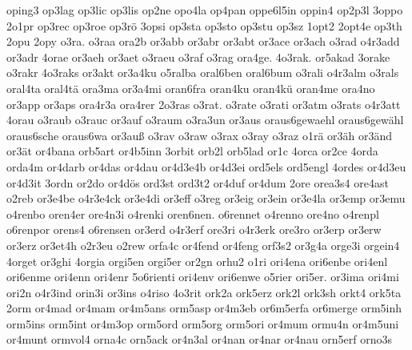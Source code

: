 {    oping3
    op3lag
    op3lic
    op3lis
    op2ne
    opo4la
    op4pan
    oppe6l5in
    oppin4
    op2p3l
    3oppo
    2o1pr
    op3rec
    op3roe
    op3rö
    3opsi
    op3sta
    op3sto
    op3stu
    op3sz
    1opt2
    2opt4e
    op3th
    2opu
    2opy
    o3ra.
    o3raa
    ora2b
    or3abb
    or3abr
    or3abt
    or3ace
    or3ach
    o3rad
    o4r3add
    or3adr
    4orae
    or3aeh
    or3aet
    o3raeu
    o3raf
    o3rag
    ora4ge.
    4o3rak.
    or5akad
    3orake
    o3rakr
    4o3raks
    or3akt
    or3a4ku
    o5ralba
    oral6ben
    oral6bum
    o3rali
    o4r3alm
    o3rals
    oral4ta
    oral4tä
    ora3ma
    or3a4mi
    oran6fra
    oran4ku
    oran4kü
    oran4me
    ora4no
    or3app
    or3aps
    ora4r3a
    ora4rer
    2o3ras
    o3rat.
    o3rate
    o3rati
    or3atm
    o3rats
    o4r3att
    4orau
    o3raub
    o3rauc
    or3auf
    o3raum
    o3ra3un
    or3aus
    oraus6gewaehl
    oraus6gewähl
    oraus6sche
    oraus6wa
    or3auß
    o3rav
    o3raw
    o3rax
    o3ray
    o3raz
    o1rä
    or3äh
    or3änd
    or3ät
    or4bana
    orb5art
    or4b5inn
    3orbit
    orb2l
    orb5lad
    or1c
    4orca
    or2ce
    4orda
    orda4m
    or4darb
    or4das
    or4dau
    or4d3e4b
    or4d3ei
    ord5els
    ord5engl
    4ordes
    or4d3eu
    or4d3it
    3ordn
    or2do
    or4dös
    ord3st
    ord3t2
    or4duf
    or4dum
    2ore
    orea3s4
    ore4ast
    o2reb
    or3e4be
    o4r3e4ck
    or3e4di
    or3eff
    o3reg
    or3eig
    or3ein
    or3e4la
    or3emp
    or3emu
    o4renbo
    oren4er
    ore4n3i
    o4renki
    oren6nen.
    o6rennet
    o4renno
    ore4no
    o4renpl
    o6renpor
    orens4
    o6rensen
    or3erd
    o4r3erf
    ore3ri
    o4r3erk
    ore3ro
    or3erp
    or3erw
    or3erz
    or3et4h
    o2r3eu
    o2rew
    orfa4c
    or4fend
    or4feng
    orf3s2
    or3g4a
    orge3i
    orgein4
    4orget
    or3ghi
    4orgia
    orgi5en
    orgi5er
    or2gn
    orhu2
    o1ri
    ori4ena
    ori6enbe
    ori4enl
    ori6enme
    ori4enn
    ori4enr
    5o6rienti
    ori4env
    ori6enwe
    o5rier
    ori5er.
    or3ima
    ori4mi
    ori2n
    o4r3ind
    orin3i
    or3ins
    o4riso
    4o3rit
    ork2a
    ork5erz
    ork2l
    ork3sh
    orkt4
    ork5ta
    2orm
    or4mad
    or4mam
    or4m5ans
    orm5asp
    or4m3eb
    or6m5erfa
    or6merge
    orm5inh
    orm5ins
    orm5int
    or4m3op
    orm5ord
    orm5org
    orm5ori
    or4mum
    ormu4n
    or4m5uni
    or4munt
    ormvol4
    orna4c
    orn5ack
    or4n3al
    or4nan
    or4nar
    or4nau
    orn5erf
    orno3s
}
